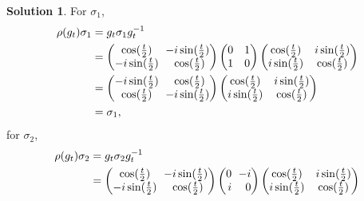 \documentclass[11pt, a4paper]{report}
\theoremstyle{definition}
\newtheorem{solution}{Solution}[part]
\newenvironment{sol}{\begin{solution}}{\end{solution}\pagebreak[3]}
\newcommand*{\m}{\ensuremath\:\, \mathllap{-}}
\begin{document}
\begin{sol}
For $\sigma_1$,
\begin{align*}
    \rho(g_t) \sigma_1 &= g_t \sigma_1 g_t^{-1} \\
        &= \begin{pmatrix}
                \cos(\tfrac{t}{2})    & \m i \sin(\tfrac{t}{2}) \\
                -i \sin(\tfrac{t}{2}) & \cos(\tfrac{t}{2})
           \end{pmatrix}
           \begin{pmatrix}
                0 & 1 \\
                1 & 0
            \end{pmatrix}
            \begin{pmatrix}
                \cos(\tfrac{t}{2})   & i \sin(\tfrac{t}{2}) \\
                i \sin(\tfrac{t}{2}) & \cos(\tfrac{t}{2})
           \end{pmatrix} \\
        &= \begin{pmatrix}
                -i \sin(\tfrac{t}{2}) & \cos(\tfrac{t}{2}) \\
                \cos(\tfrac{t}{2})   & \m i \sin(\tfrac{t}{2})
           \end{pmatrix}
           \begin{pmatrix}
                \cos(\tfrac{t}{2})   & i \sin(\tfrac{t}{2}) \\
                i \sin(\tfrac{t}{2}) & \cos(\tfrac{t}{2})
           \end{pmatrix} \\
        &= \sigma_1,
\end{align*}
for $\sigma_2$,
\begin{align*}
    \rho(g_t) \sigma_2 &= g_t \sigma_2 g_t^{-1} \\
        &= \begin{pmatrix}
                \cos(\tfrac{t}{2})    & \m i \sin(\tfrac{t}{2}) \\
                -i \sin(\tfrac{t}{2}) & \cos(\tfrac{t}{2})
           \end{pmatrix}
            \begin{pmatrix*}[r]
                0 & \m i \\
                i &    0
            \end{pmatrix*}
            \begin{pmatrix}
                \cos(\tfrac{t}{2})   & i \sin(\tfrac{t}{2}) \\
                i \sin(\tfrac{t}{2}) & \cos(\tfrac{t}{2})

\end{pmatrix}
\end{align*}
\end{sol}
\end{document}
